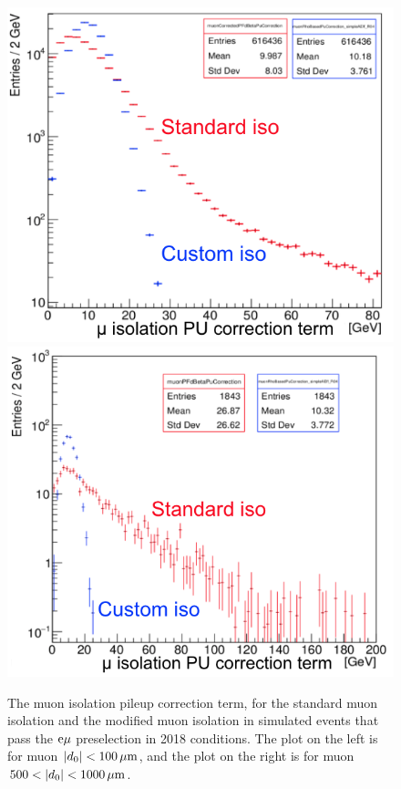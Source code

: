 \begin{figure}[hbtp]
\centering
\includegraphics[scale=0.3]{figures/selection/CustomVsStandardMuIsoPUcorrection_2018emuTTbar_PCR.png}
\includegraphics[scale=0.3]{figures/selection/CustomVsStandardMuIsoPUcorrection_2018emuTTbar_500To1000um.png}
\caption{The muon isolation pileup correction term, for the standard muon isolation and the modified muon isolation in simulated \ttbar events that pass the $\mathrm{e}{\mu}$ preselection in 2018 conditions. The plot on the left is for muon $\lvert d_0 \rvert<100\,\mu\text{m}$, and the plot on the right is for muon $500<\lvert d_0 \rvert<1000\,\mu\text{m}$.}
\label{iso_pu_term_comparison}
\end{figure}

